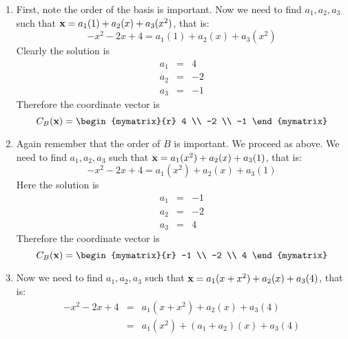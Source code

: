 \begin{solution}
  \begin{enumerate}
  \item First, note the order of the basis is important.  Now we need
    to find $a_1, a_2, a_3$ such that
    $\mbox{\bf x} = a_1 (1) + a_2 (x) + a_3(x^2)$, that is:
    \begin{equation*}
      -x^2 -2x + 4 = a_1 (1) + a_2 (x) + a_3(x^2)
    \end{equation*}
    Clearly the solution is
    \begin{eqnarray*}
      a_1 &=& 4 \\
      a_2 &=& -2 \\
      a_3 &=& -1
    \end{eqnarray*}
    Therefore the coordinate vector is
    \begin{equation*}
      C_B(\vect{x}) =
      \begin{mymatrix}{r}
        4 \\
        -2 \\
        -1
      \end{mymatrix}
    \end{equation*}

  \item Again remember that the order of $B$ is important. We proceed
    as above.  We need to find $a_1, a_2, a_3$ such that
    $\mbox{\bf x} = a_1 (x^2) + a_2 (x) + a_3(1)$, that is:
    \begin{equation*}
      -x^2 -2x + 4 = a_1 (x^2) + a_2 (x) + a_3(1)
    \end{equation*}
    Here the solution is
    \begin{eqnarray*}
      a_1 &=& -1 \\
      a_2 &=& -2 \\
      a_3 &=& 4
    \end{eqnarray*}
    Therefore the coordinate vector is
    \begin{equation*}
      C_B(\vect{x}) =
      \begin{mymatrix}{r}
        -1 \\
        -2 \\
        4
      \end{mymatrix}
    \end{equation*}

  \item Now we need to find $a_1, a_2, a_3$ such that
    $\mbox{\bf x} = a_1 (x + x^2) + a_2 (x) + a_3(4)$, that is:
    \begin{eqnarray*}
      -x^2 -2x + 4 &=& a_1 (x + x^2 ) + a_2 (x) + a_3(4)\\
                   &=& a_1 (x^2) + (a_1 + a_2) (x) + a_3(4)
    \end{eqnarray*}


\end{enumerate}
\end{solution}
